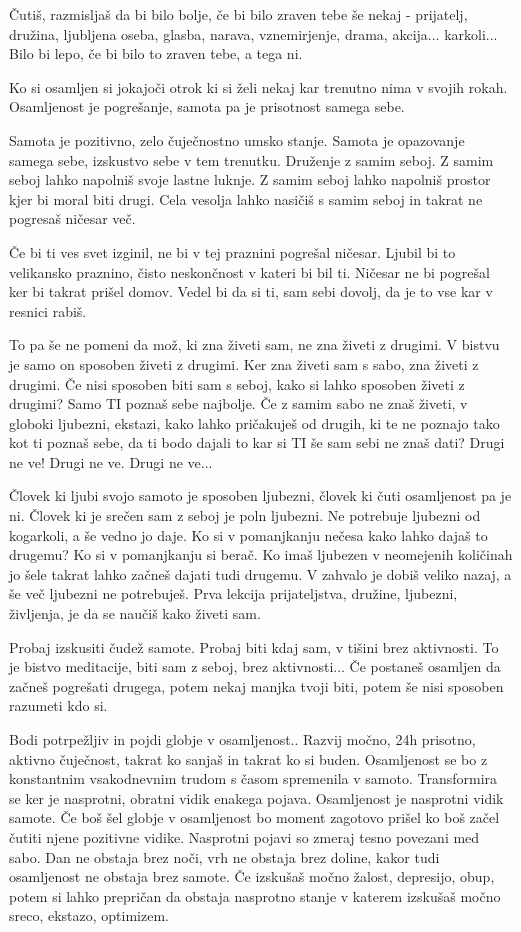 Čutiš, razmisljaš da bi bilo bolje, če bi bilo zraven tebe še nekaj - prijatelj, družina, ljubljena oseba, glasba, narava, vznemirjenje, drama, akcija... karkoli... Bilo bi lepo, če bi bilo to zraven tebe, a tega ni. 

Ko si osamljen si jokajoči otrok ki si želi nekaj kar trenutno nima v svojih rokah. Osamljenost je pogrešanje, samota pa je prisotnost samega sebe. 

Samota je pozitivno, zelo čuječnostno umsko stanje. Samota je opazovanje samega sebe, izskustvo sebe v tem trenutku. Druženje z samim seboj.  Z samim seboj lahko napolniš svoje lastne luknje. Z samim seboj lahko napolniš prostor kjer bi moral biti drugi. Cela vesolja lahko nasičiš s samim seboj in takrat ne pogresaš ničesar več. 

Če bi ti ves svet izginil, ne bi v tej praznini pogrešal ničesar.  Ljubil bi to velikansko praznino, čisto neskončnost v kateri bi bil ti. Ničesar ne bi pogrešal ker bi takrat prišel domov. Vedel bi da si ti, sam sebi dovolj, da je to vse kar v resnici rabiš. 

To pa še ne pomeni da mož, ki zna živeti sam, ne zna živeti z drugimi. V bistvu je samo on sposoben živeti z drugimi. Ker zna živeti sam s sabo, zna živeti z drugimi. Če nisi sposoben biti sam s seboj, kako si lahko sposoben živeti z drugimi? Samo TI poznaš sebe najbolje. Če z samim sabo ne znaš živeti, v globoki ljubezni, ekstazi, kako lahko pričakuješ od drugih, ki te ne poznajo tako kot ti poznaš sebe, da ti bodo dajali to kar si TI še sam sebi ne znaš dati? Drugi ne ve! Drugi ne ve. Drugi ne ve... 

Človek ki ljubi svojo samoto je sposoben ljubezni, človek ki čuti osamljenost pa je ni. Človek ki je srečen sam z seboj je poln ljubezni. Ne potrebuje ljubezni od kogarkoli, a še vedno jo daje. Ko si v pomanjkanju nečesa kako lahko dajaš to drugemu? Ko si v pomanjkanju si berač. Ko imaš ljubezen v neomejenih količinah jo šele takrat lahko začneš dajati tudi drugemu. V zahvalo je dobiš veliko nazaj, a še več ljubezni ne potrebuješ.  Prva lekcija prijateljstva, družine, ljubezni, življenja, je da se naučiš kako živeti sam. 

Probaj izskusiti čudež samote. Probaj biti kdaj sam, v tišini brez aktivnosti. To je bistvo meditacije, biti sam z seboj, brez aktivnosti... Če postaneš osamljen da začneš pogrešati drugega, potem nekaj manjka tvoji biti, potem še nisi sposoben razumeti kdo si. 

Bodi potrpežljiv in pojdi globje v osamljenost.. Razvij močno, 24h prisotno, aktivno čuječnost, takrat ko sanjaš in takrat ko si buden. Osamljenost se bo z konstantnim vsakodnevnim trudom s časom spremenila v samoto. Transformira se ker je nasprotni, obratni vidik enakega pojava. Osamljenost je nasprotni vidik samote. Če boš šel globje v osamljenost bo moment zagotovo prišel ko boš začel čutiti njene pozitivne vidike. Nasprotni pojavi so zmeraj tesno povezani med sabo. Dan ne obstaja brez noči, vrh ne obstaja brez doline, kakor tudi osamljenost ne obstaja brez samote. Če izskušaš močno žalost, depresijo, obup, potem si lahko prepričan da obstaja nasprotno stanje v katerem izskušaš močno sreco, ekstazo, optimizem. 

